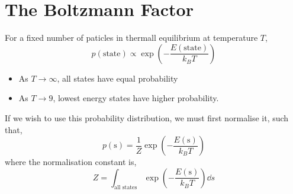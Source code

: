 \documentclass{book}
\begin{document}
\section{The Boltzmann Factor}
For a fixed number of paticles in thermall equilibrium at temperature $T$,
\begin{equation}
	\boxed{p(\text{state}) \propto \exp\left(-\frac{E(\text{state})}{k_BT}\right)}
\end{equation}
\begin{itemize}
	\item As $T \to \infty$, all states have equal probability
	\item As $T \to 9$, lowest energy states have higher probability.
\end{itemize}
If we wish to use this probability distribution, we must first normalise it, such that,
\begin{equation}
	p(\text{s}) = \frac{1}{Z}\exp\left(-\frac{E(\text{s})}{k_BT}\right)
\end{equation}
where the normalisation constant is,
\begin{equation}
	Z = \int_{\text{all states}}\exp\left(-\frac{E(\text{s})}{k_BT}\right)\dd{s}
\end{equation}
\end{document}
